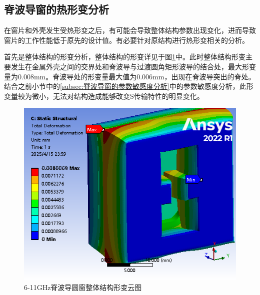 \documentclass[master]{thesis-uestc}
\begin{document}
\subsection{脊波导窗的热形变分析}
在窗片和外壳发生受热形变之后，有可能会导致整体结构参数出现变化，进而导致窗片的工作性能低于原先的设计值。有必要针对原结构进行热形变相关的分析。

首先是整体结构的形变分析，整体结构的形变详见于图\ref{fig:X整体结构形变}中。此时整体结构形变主要发生在金属外壳之间的交界处和脊波导与过渡圆角矩形波导的结合处，最大形变量为0.008mm。脊波导处的形变量最大值为0.006mm，出现在脊波导突出的脊处。结合之前小节中的\ref{subsec:脊波导窗的参数敏感度分析}中的参数敏感度分析，此形变量较为微小，无法对结构造成能够改变S传输特性的明显变化。
\begin{figure}[!htb]
    \centering
    \includegraphics[width=0.4\linewidth]{pic/chapter3/X输入窗与波导.png}
    \caption{6-11GHz脊波导圆窗整体结构形变云图}
    \label{fig:X整体结构形变}
\end{figure}
\end{document}
